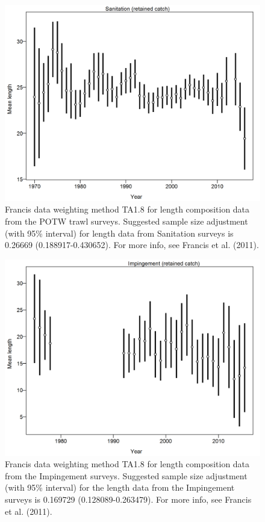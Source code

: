 \documentclass[12pt,]{article}
\begin{document}
\begin{figure}[htbp]
\centering
\includegraphics{r4ss/plots_mod1/comp_lendat_data_weighting_TA1.8_Sanitation.png}
\caption{Francis data weighting method TA1.8 for length composition data
from the POTW trawl surveys. Suggested sample size adjustment (with 95\%
interval) for length data from Sanitation surveys is 0.26669
(0.188917-0.430652). For more info, see Francis et al. (2011).
\label{fig:comp_lendat_data_weighting_TA1.8_Sanitation}}
\end{figure}

\begin{figure}[htbp]
\centering
\includegraphics{r4ss/plots_mod1/comp_lendat_data_weighting_TA1.8_Impingement.png}
\caption{Francis data weighting method TA1.8 for length composition data
from the Impingement surveys. Suggested sample size adjustment (with
95\% interval) for the length data from the Impingement surveys is
0.169729 (0.128089-0.263479). For more info, see Francis et al. (2011).
\label{fig:comp_lendat_data_weighting_TA1.8_Impingement}}
\end{figure}
\end{document}
